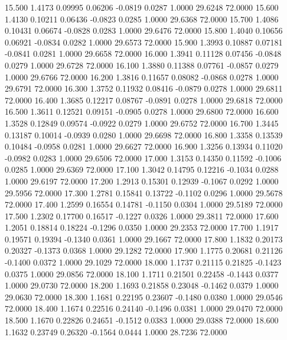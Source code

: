   15.500   1.4173   0.09995   0.06206  -0.0819   0.0287   1.0000  29.6248  72.0000
  15.600   1.4130   0.10211   0.06436  -0.0823   0.0285   1.0000  29.6368  72.0000
  15.700   1.4086   0.10431   0.06674  -0.0828   0.0283   1.0000  29.6476  72.0000
  15.800   1.4040   0.10656   0.06921  -0.0834   0.0282   1.0000  29.6573  72.0000
  15.900   1.3993   0.10887   0.07181  -0.0841   0.0281   1.0000  29.6658  72.0000
  16.000   1.3941   0.11128   0.07456  -0.0848   0.0279   1.0000  29.6728  72.0000
  16.100   1.3880   0.11388   0.07761  -0.0857   0.0279   1.0000  29.6766  72.0000
  16.200   1.3816   0.11657   0.08082  -0.0868   0.0278   1.0000  29.6791  72.0000
  16.300   1.3752   0.11932   0.08416  -0.0879   0.0278   1.0000  29.6811  72.0000
  16.400   1.3685   0.12217   0.08767  -0.0891   0.0278   1.0000  29.6818  72.0000
  16.500   1.3611   0.12521   0.09151  -0.0905   0.0278   1.0000  29.6800  72.0000
  16.600   1.3528   0.12849   0.09574  -0.0922   0.0279   1.0000  29.6752  72.0000
  16.700   1.3445   0.13187   0.10014  -0.0939   0.0280   1.0000  29.6698  72.0000
  16.800   1.3358   0.13539   0.10484  -0.0958   0.0281   1.0000  29.6627  72.0000
  16.900   1.3256   0.13934   0.11020  -0.0982   0.0283   1.0000  29.6506  72.0000
  17.000   1.3153   0.14350   0.11592  -0.1006   0.0285   1.0000  29.6369  72.0000
  17.100   1.3042   0.14795   0.12216  -0.1034   0.0288   1.0000  29.6197  72.0000
  17.200   1.2913   0.15301   0.12939  -0.1067   0.0292   1.0000  29.5956  72.0000
  17.300   1.2781   0.15841   0.13722  -0.1102   0.0296   1.0000  29.5678  72.0000
  17.400   1.2599   0.16554   0.14781  -0.1150   0.0304   1.0000  29.5189  72.0000
  17.500   1.2302   0.17700   0.16517  -0.1227   0.0326   1.0000  29.3811  72.0000
  17.600   1.2051   0.18814   0.18224  -0.1296   0.0350   1.0000  29.2353  72.0000
  17.700   1.1917   0.19571   0.19394  -0.1340   0.0361   1.0000  29.1667  72.0000
  17.800   1.1832   0.20173   0.20327  -0.1373   0.0368   1.0000  29.1282  72.0000
  17.900   1.1775   0.20681   0.21126  -0.1400   0.0372   1.0000  29.1029  72.0000
  18.000   1.1737   0.21115   0.21825  -0.1423   0.0375   1.0000  29.0856  72.0000
  18.100   1.1711   0.21501   0.22458  -0.1443   0.0377   1.0000  29.0730  72.0000
  18.200   1.1693   0.21858   0.23048  -0.1462   0.0379   1.0000  29.0630  72.0000
  18.300   1.1681   0.22195   0.23607  -0.1480   0.0380   1.0000  29.0546  72.0000
  18.400   1.1674   0.22516   0.24140  -0.1496   0.0381   1.0000  29.0470  72.0000
  18.500   1.1670   0.22826   0.24651  -0.1512   0.0383   1.0000  29.0388  72.0000
  18.600   1.1632   0.23749   0.26320  -0.1564   0.0444   1.0000  28.7236  72.0000
